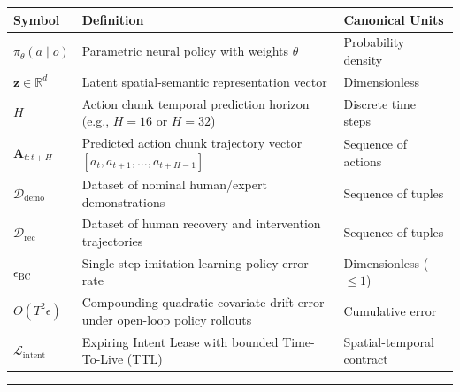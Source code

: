 \documentclass[
  10pt,
  letterpaper,
  twoside,
  openright,
  numbers=noenddot,
  headings=standardclasses
]{scrbook}
\begin{document}

{\def\LTcaptype{none} %
\begin{longtable}[]{@{}
  >{\raggedright\arraybackslash}p{}
  >{\raggedright\arraybackslash}p{}
  >{\raggedright\arraybackslash}p{}@{}}
\toprule\noalign{}
\begin{minipage}[b]{\linewidth}\raggedright
Symbol
\end{minipage} & \begin{minipage}[b]{\linewidth}\raggedright
Definition
\end{minipage} & \begin{minipage}[b]{\linewidth}\raggedright
Canonical Units
\end{minipage} \\
\midrule\noalign{}
\endhead
\bottomrule\noalign{}
\endlastfoot
\(\pi_\theta(a \mid o)\) & Parametric neural policy with weights
\(\theta\) & Probability density \\
\(\mathbf{z} \in \mathbb{R}^d\) & Latent spatial-semantic representation
vector & Dimensionless \\
\(H\) & Action chunk temporal prediction horizon (e.g., \(H=16\) or
\(H=32\)) & Discrete time steps \\
\(\mathbf{A}_{t:t+H}\) & Predicted action chunk trajectory vector
\([a_t, a_{t+1}, \dots, a_{t+H-1}]\) & Sequence of actions \\
\(\mathcal{D}_{\text{demo}}\) & Dataset of nominal human/expert
demonstrations & Sequence of tuples \\
\(\mathcal{D}_{\text{rec}}\) & Dataset of human recovery and
intervention trajectories & Sequence of tuples \\
\(\epsilon_{\text{BC}}\) & Single-step imitation learning policy error
rate & Dimensionless (\(\le 1\)) \\
\(O(T^2 \epsilon)\) & Compounding quadratic covariate drift error under
open-loop policy rollouts & Cumulative error \\
\(\mathcal{L}_{\text{intent}}\) & Expiring Intent Lease with bounded
Time-To-Live (TTL) & Spatial-temporal contract \\
\end{longtable}
}

\begin{center}\rule{0.5\linewidth}{0.5pt}\end{center}
\end{document}
